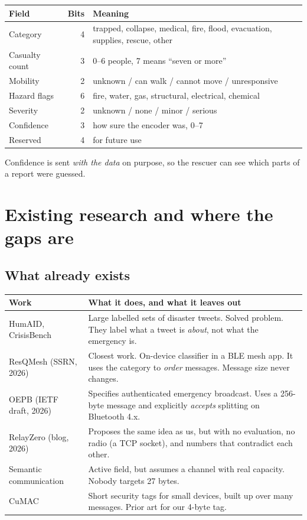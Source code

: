 \documentclass[11pt,a4paper]{article}
\begin{document}
\begin{center}
\begin{tabular}{l r p{7.6cm}}
\toprule
\textbf{Field} & \textbf{Bits} & \textbf{Meaning} \\
\midrule
Category & 4 & trapped, collapse, medical, fire, flood, evacuation, supplies, rescue, other \\
Casualty count & 3 & 0--6 people, 7 means ``seven or more'' \\
Mobility & 2 & unknown / can walk / cannot move / unresponsive \\
Hazard flags & 6 & fire, water, gas, structural, electrical, chemical \\
Severity & 2 & unknown / none / minor / serious \\
Confidence & 3 & how sure the encoder was, 0--7 \\
Reserved & 4 & for future use \\
\bottomrule
\end{tabular}
\end{center}

Confidence is sent \emph{with the data} on purpose, so the rescuer can see
which parts of a report were guessed.

\section{Existing research and where the gaps are}

\subsection{What already exists}

\begin{center}
\begin{tabular}{p{3.4cm} p{10.6cm}}
\toprule
\textbf{Work} & \textbf{What it does, and what it leaves out} \\
\midrule
HumAID, CrisisBench & Large labelled sets of disaster tweets. Solved problem.
They label what a tweet is \emph{about}, not what the emergency is. \\
\addlinespace
ResQMesh (SSRN, 2026) & Closest work. On-device classifier in a BLE mesh app.
It uses the category to \emph{order} messages. Message size never changes. \\
\addlinespace
OEPB (IETF draft, 2026) & Specifies authenticated emergency broadcast. Uses a
256-byte message and explicitly \emph{accepts} splitting on Bluetooth 4.x. \\
\addlinespace
RelayZero (blog, 2026) & Proposes the same idea as us, but with no evaluation,
no radio (a TCP socket), and numbers that contradict each other. \\
\addlinespace
Semantic communication & Active field, but assumes a channel with real
capacity. Nobody targets 27 bytes. \\
\addlinespace
CuMAC & Short security tags for small devices, built up over many messages.
Prior art for our 4-byte tag. \\
\bottomrule
\end{tabular}
\end{center}
\end{document}

